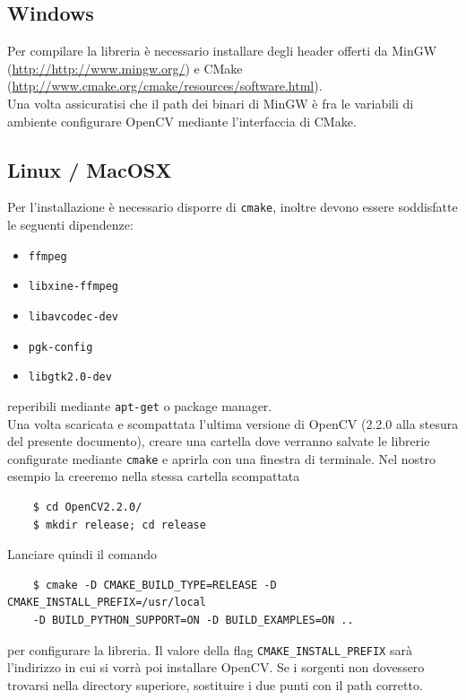 \documentclass[12pt]{report}
\begin{document}
\subsection{Windows}
Per compilare la libreria \`e necessario installare degli header offerti da MinGW (\url{http://http://www.mingw.org/}) e CMake (\url{http://www.cmake.org/cmake/resources/software.html}).\\
\noindent Una volta assicuratisi che il path dei binari di MinGW \`e fra le variabili di ambiente configurare OpenCV mediante l'interfaccia di CMake.

\subsection{Linux / MacOSX}

\noindent Per l'installazione \`e necessario disporre di \verb|cmake|, inoltre devono essere soddisfatte le seguenti dipendenze:
\begin{itemize}
\item \verb|ffmpeg|
\item \verb|libxine-ffmpeg|
\item \verb|libavcodec-dev|
\item \verb|pgk-config|
\item \verb|libgtk2.0-dev|
\end{itemize}

\noindent reperibili mediante \verb|apt-get| o package manager.\\

\noindent Una volta scaricata e scompattata l'ultima versione di OpenCV (2.2.0 alla stesura del presente documento), creare una cartella dove verranno salvate le librerie configurate mediante \verb|cmake| e aprirla con una finestra di terminale. Nel nostro esempio la creeremo nella stessa cartella scompattata

\begin{verbatim}
	$ cd OpenCV2.2.0/
	$ mkdir release; cd release
\end{verbatim}

\noindent Lanciare quindi il comando

\begin{verbatim}
	$ cmake -D CMAKE_BUILD_TYPE=RELEASE -D CMAKE_INSTALL_PREFIX=/usr/local
	-D BUILD_PYTHON_SUPPORT=ON -D BUILD_EXAMPLES=ON ..
\end{verbatim}

\noindent per configurare la libreria. Il valore della flag \verb|CMAKE_INSTALL_PREFIX| sar\`a l'indirizzo in cui si vorr\`a poi installare OpenCV. Se i sorgenti non dovessero trovarsi nella directory superiore, sostituire i due punti con il path corretto.\\
\end{document}
